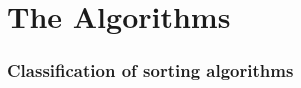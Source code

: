 \documentclass[a4paper]{article}
\begin{document}
        

        
    \newpage
    \part{The Algorithms}




        \setcounter{section}{0}
        \section{Classification of sorting algorithms}
\end{document}
